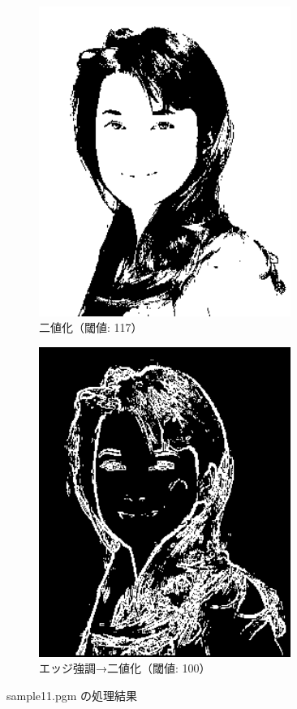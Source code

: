 \documentclass[a4paper,12pt]{jsarticle}
\begin{document}
\begin{figure}[!htbp]
\begin{subfigure}[b]{0.45\textwidth}
    \centering
    \includegraphics[width=0.9\textwidth]{./images/binarized_sample11_binary.png}
    \caption{二値化（閾値: 117）}
\end{subfigure}
\hfill
\begin{subfigure}[b]{0.45\textwidth}
    \centering
    \includegraphics[width=0.9\textwidth]{./images/combined_sample11_combined.png}
    \caption{エッジ強調→二値化（閾値: 100）}
\end{subfigure}
\caption{sample11.pgm の処理結果}
\label{fig:sample11}
\end{figure}
\end{document}

